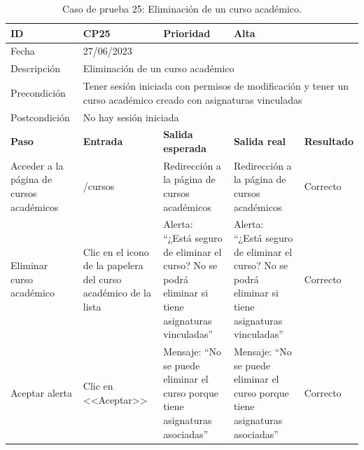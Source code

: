 \begin{table}[H]
\small
\begin{tabular}{p{} p{} p{} p{} p{}}
\cellcolor{gray!25}
ID   & CP25 & \cellcolor{gray!25} Prioridad   & Alta \\ \hline
\cellcolor{gray!25} Fecha	&	\multicolumn{4}{l}{27/06/2023} \\ \hline
\cellcolor{gray!25} Descripción		&	\multicolumn{4}{l}{Eliminación de un curso académico} \\ \hline                                            
\cellcolor{gray!25}
Precondición  & \multicolumn{4}{p{.66\textwidth}}{Tener sesión iniciada con permisos de modificación y tener un curso académico creado con asignaturas vinculadas} \\ \hline
\cellcolor{gray!25} Postcondición & \multicolumn{4}{l}{No hay sesión iniciada}                                                    \\ \hline
\rowcolor{gray!25}
\textbf{Paso}   & \textbf{Entrada} & \textbf{Salida esperada} & \textbf{Salida real} & \textbf{Resultado} \\ \hline
Acceder a la página de cursos académicos
& /cursos                                                                          
& Redirección a la página de cursos académicos                                  
& Redirección a la página de cursos académicos                                   
& Correcto                            
\\ \hline
Eliminar curso académico
& Clic en el icono de la papelera del curso académico de la lista
& Alerta: ``¿Está seguro de eliminar el curso? No se podrá eliminar si tiene asignaturas vinculadas''
& Alerta: ``¿Está seguro de eliminar el curso? No se podrá eliminar si tiene asignaturas vinculadas''
& Correcto
\\ \hline
Aceptar alerta
& Clic en <<Aceptar>>
& Mensaje: ``No se puede eliminar el curso porque tiene asignaturas asociadas''
& Mensaje: ``No se puede eliminar el curso porque tiene asignaturas asociadas''
& Correcto
\\ \hline          
\end{tabular}
\caption{Caso de prueba 25: Eliminación de un curso académico.}\label{table:CP25}
\end{table}

